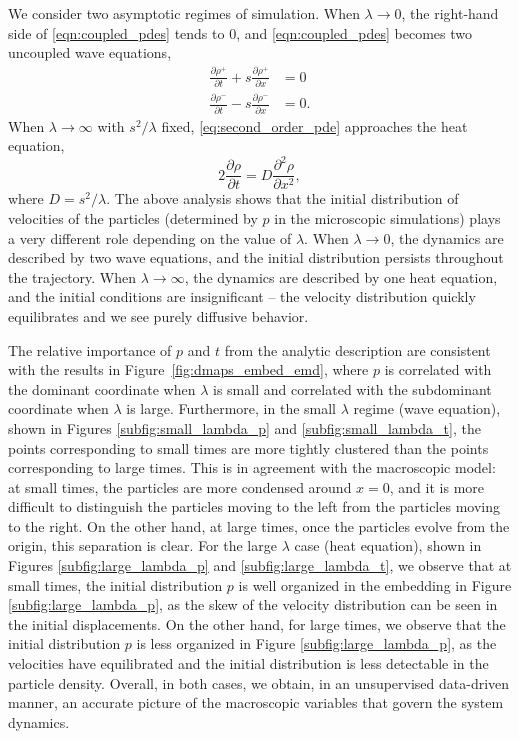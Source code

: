 \documentclass[3p]{elsarticle}
\begin{document}
We consider two asymptotic regimes of simulation.
%
When $\lambda \rightarrow 0$, the right-hand side of \eqref{eqn:coupled_pdes} tends to 0, and \eqref{eqn:coupled_pdes} becomes two uncoupled wave equations,
\begin{equation}
\begin{aligned}
\frac{\partial \rho^+}{\partial t} + s \frac{\partial \rho^+}{\partial x} & = 0 \\
\frac{\partial \rho^-}{\partial t} - s \frac{\partial \rho^-}{\partial x} & = 0.
\end{aligned}
\end{equation}
%
When $\lambda \rightarrow \infty$ with $s^2/\lambda$ fixed, \eqref{eq:second_order_pde} approaches the heat equation,
\begin{equation}
2 \frac{\partial \rho}{\partial t} = D \frac{\partial ^2 \rho}{\partial x^2},
\end{equation}
%
where $D=s^2/\lambda$.
%
The above analysis shows that the initial distribution of velocities of the particles (determined by $p$ in the microscopic simulations) plays a very different role depending on the value of $\lambda$.
%
When $\lambda \rightarrow 0$, the dynamics are described by two wave equations, and the initial distribution persists throughout the trajectory.
%
When $\lambda \rightarrow \infty$, the dynamics are described by one heat equation, and the initial conditions are insignificant -- the velocity distribution quickly equilibrates and we see purely diffusive behavior.

The relative importance of $p$ and $t$ from the analytic description are consistent with the results in Figure~\ref{fig:dmaps_embed_emd}, where $p$ is correlated with the dominant coordinate when $\lambda$ is small and correlated with the subdominant coordinate when $\lambda$ is large. 
%
Furthermore, in the small $\lambda$ regime (wave equation), shown in Figures \ref{subfig:small_lambda_p} and \ref{subfig:small_lambda_t}, the points corresponding to small times are more tightly clustered than the points corresponding to large times.
%
This is in agreement with the macroscopic model: at small times, the particles are more condensed around $x=0$, and it is more difficult to distinguish the particles moving to the left from the particles moving to the right. 
%
On the other hand, at large times, once the particles evolve from the origin, this separation is clear.  
%
For the large $\lambda$ case (heat equation), shown in Figures \ref{subfig:large_lambda_p} and \ref{subfig:large_lambda_t}, we observe that at small times, the initial distribution $p$ is well organized in the embedding in Figure \ref{subfig:large_lambda_p}, as the skew of the velocity distribution can be seen in the initial displacements.
%
On the other hand, for large times, we observe that the initial distribution $p$ is less organized in Figure \ref{subfig:large_lambda_p}, as the velocities have equilibrated and the initial distribution is less detectable in the particle density.
%
Overall, in both cases, we obtain, in an unsupervised data-driven manner, an accurate picture of the macroscopic variables that govern the system dynamics.
\end{document}
